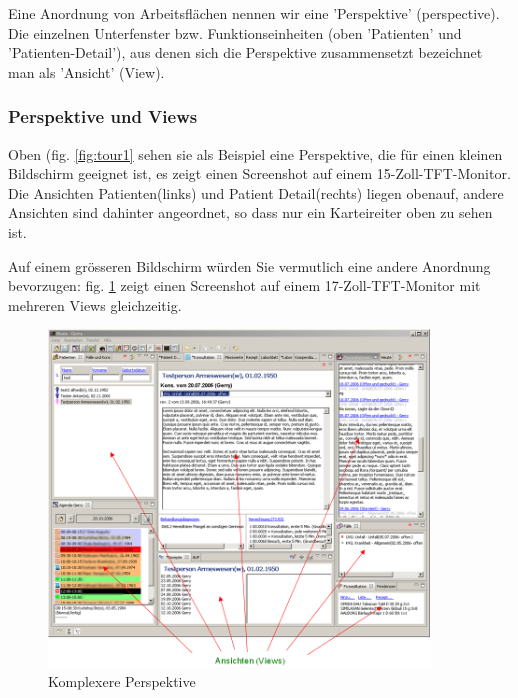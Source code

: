 Eine Anordnung von Arbeitsflächen nennen wir eine 'Perspektive' (perspective). Die einzelnen Unterfenster bzw. Funktionseinheiten (oben 'Patienten' und 'Patienten-Detail'), aus denen sich die Perspektive zusammensetzt bezeichnet man als 'Ansicht' (View).

\subsubsection{Perspektive und Views}

Oben (fig. \ref{fig:tour1} sehen sie als Beispiel eine Perspektive, die für
einen kleinen Bildschirm geeignet ist, es zeigt einen
Screenshot auf einem 15-Zoll-TFT-Monitor. Die Ansichten \glqq
Patienten\grqq{}(links) und \glqq Patient Detail\grqq{}(rechts) liegen obenauf,
andere Ansichten sind dahinter angeordnet, so dass nur ein Karteireiter oben
zu sehen ist.

Auf einem grösseren Bildschirm würden Sie vermutlich eine andere Anordnung
bevorzugen: fig. \ref{fig:tour2} zeigt einen Screenshot auf einem
17-Zoll-TFT-Monitor mit mehreren Views gleichzeitig.

\begin{figure}[htp]
\begin{center}
  \includegraphics[width=0.9\textwidth]{images/tour2}
  \caption{Komplexere Perspektive}
  \label{fig:tour2}
\end{center}
\end{figure}

